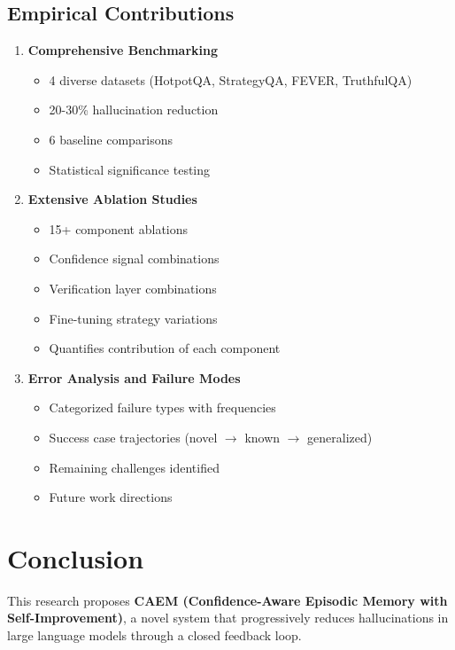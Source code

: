 \documentclass[12pt,a4paper]{article}
\theoremstyle{definition}
\begin{document}
\subsection{Empirical Contributions}

\begin{enumerate}
    \item \textbf{Comprehensive Benchmarking}
    \begin{itemize}
        \item 4 diverse datasets (HotpotQA, StrategyQA, FEVER, TruthfulQA)
        \item 20-30\% hallucination reduction
        \item 6 baseline comparisons
        \item Statistical significance testing
    \end{itemize}
    
    \item \textbf{Extensive Ablation Studies}
    \begin{itemize}
        \item 15+ component ablations
        \item Confidence signal combinations
        \item Verification layer combinations
        \item Fine-tuning strategy variations
        \item Quantifies contribution of each component
    \end{itemize}
    
    \item \textbf{Error Analysis and Failure Modes}
    \begin{itemize}
        \item Categorized failure types with frequencies
        \item Success case trajectories (novel $\rightarrow$ known $\rightarrow$ generalized)
        \item Remaining challenges identified
        \item Future work directions
    \end{itemize}
\end{enumerate}

\newpage

\section{Conclusion}

This research proposes \textbf{CAEM (Confidence-Aware Episodic Memory with Self-Improvement)}, a novel system that progressively reduces hallucinations in large language models through a closed feedback loop.
\end{document}
